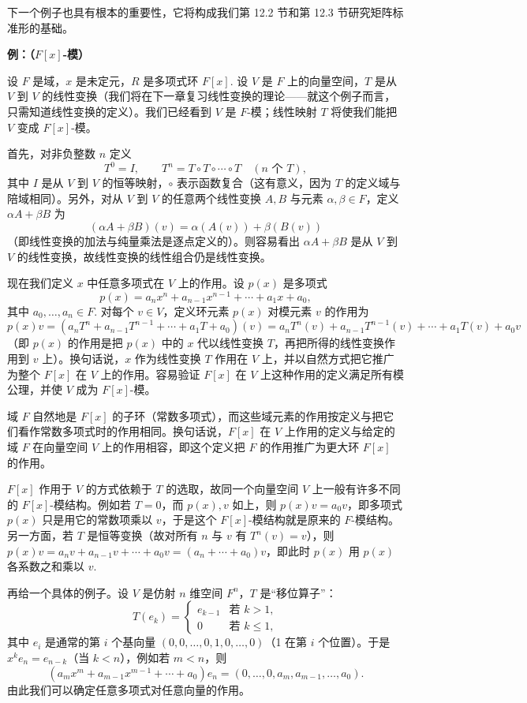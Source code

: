 下一个例子也具有根本的重要性，它将构成我们第 12.2 节和第 12.3 节研究矩阵标准形的基础。

\noindent\textbf{例：（\(F[x]\)-模）}

设 \(F\) 是域，\(x\) 是未定元，\(R\) 是多项式环 \(F[x]\). 设 \(V\) 是 \(F\) 上的向量空间，\(T\) 是从 \(V\) 到 \(V\) 的线性变换（我们将在下一章复习线性变换的理论——就这个例子而言，只需知道线性变换的定义）。我们已经看到 \(V\) 是 \(F\)-模；线性映射 \(T\) 将使我们能把 \(V\) 变成 \(F[x]\)-模。

首先，对非负整数 \(n\) 定义
\[
T^0 = I, \qquad T^n = T \circ T \circ \cdots \circ T \quad (n \text{ 个 } T),
\]
其中 \(I\) 是从 \(V\) 到 \(V\) 的恒等映射，\(\circ\) 表示函数复合（这有意义，因为 \(T\) 的定义域与陪域相同）。另外，对从 \(V\) 到 \(V\) 的任意两个线性变换 \(A, B\) 与元素 \(\alpha, \beta \in F\)，定义 \(\alpha A+\beta B\) 为
\[
(\alpha A+\beta B)(v) = \alpha(A(v))+\beta(B(v))
\]
（即线性变换的加法与纯量乘法是逐点定义的）。则容易看出 \(\alpha A+\beta B\) 是从 \(V\) 到 \(V\) 的线性变换，故线性变换的线性组合仍是线性变换。

现在我们定义 \(x\) 中任意多项式在 \(V\) 上的作用。设 \(p(x)\) 是多项式
\[
p(x) = a_nx^n + a_{n-1}x^{n-1} + \cdots + a_1x + a_0,
\]
其中 \(a_0, \ldots, a_n \in F\). 对每个 \(v \in V\)，定义环元素 \(p(x)\) 对模元素 \(v\) 的作用为
\[
p(x)v = (a_nT^n+a_{n-1}T^{n-1}+\cdots+a_1T+a_0)(v) = a_nT^n(v)+a_{n-1}T^{n-1}(v)+\cdots+a_1T(v)+a_0v
\]
（即 \(p(x)\) 的作用是把 \(p(x)\) 中的 \(x\) 代以线性变换 \(T\)，再把所得的线性变换作用到 \(v\) 上）。换句话说，\(x\) 作为线性变换 \(T\) 作用在 \(V\) 上，并以自然方式把它推广为整个 \(F[x]\) 在 \(V\) 上的作用。容易验证 \(F[x]\) 在 \(V\) 上这种作用的定义满足所有模公理，并使 \(V\) 成为 \(F[x]\)-模。

域 \(F\) 自然地是 \(F[x]\) 的子环（常数多项式），而这些域元素的作用按定义与把它们看作常数多项式时的作用相同。换句话说，\(F[x]\) 在 \(V\) 上作用的定义与给定的域 \(F\) 在向量空间 \(V\) 上的作用相容，即这个定义把 \(F\) 的作用推广为更大环 \(F[x]\) 的作用。

\(F[x]\) 作用于 \(V\) 的方式依赖于 \(T\) 的选取，故同一个向量空间 \(V\) 上一般有许多不同的 \(F[x]\)-模结构。例如若 \(T = 0\)，而 \(p(x), v\) 如上，则 \(p(x)v = a_0v\)，即多项式 \(p(x)\) 只是用它的常数项乘以 \(v\)，于是这个 \(F[x]\)-模结构就是原来的 \(F\)-模结构。另一方面，若 \(T\) 是恒等变换（故对所有 \(n\) 与 \(v\) 有 \(T^n(v) = v\)），则 \(p(x)v = a_nv+a_{n-1}v+\cdots+a_0v = (a_n+\cdots+a_0)v\)，即此时 \(p(x)\) 用 \(p(x)\) 各系数之和乘以 \(v\).

再给一个具体的例子。设 \(V\) 是仿射 \(n\) 维空间 \(F^n\)，\(T\) 是“移位算子”：
\[
T(e_k) = \begin{cases} e_{k-1} & \text{若 } k > 1, \\ 0 & \text{若 } k \le 1, \end{cases}
\]
其中 \(e_i\) 是通常的第 \(i\) 个基向量 \((0, 0, \ldots, 0, 1, 0, \ldots, 0)\)（1 在第 \(i\) 个位置）。于是 \(x^ke_n = e_{n-k}\)（当 \(k < n\)），例如若 \(m < n\)，则
\[
(a_mx^m+a_{m-1}x^{m-1}+\cdots+a_0)e_n = (0, \ldots, 0, a_m, a_{m-1}, \ldots, a_0).
\]
由此我们可以确定任意多项式对任意向量的作用。


